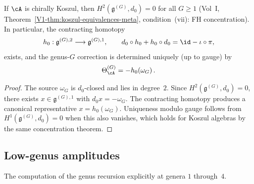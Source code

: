 \begin{corollary}
\label{cor:contracting-homotopy-koszul}
If $\cA$ is chirally Koszul, then $H^2(\mathfrak{g}^{(G)}, d_0) = 0$ for all
$G \geq 1$ (Vol~I, Theorem~\ref*{V1-thm:koszul-equivalences-meta}, condition~(vii):
FH concentration). In particular, the contracting homotopy
\begin{equation}
h_0 : \mathfrak{g}^{(G),2} \longrightarrow \mathfrak{g}^{(G),1},
\qquad
d_0 \circ h_0 + h_0 \circ d_0 = \id - \iota \circ \pi,
\end{equation}
exists, and the genus-$G$ correction is determined uniquely (up to gauge) by
\begin{equation}
\Theta_\cA^{(G)} = -h_0\!\left(\omega_G\right).
\end{equation}
\end{corollary}

\begin{proof}
The source $\omega_G$ is $d_0$-closed and lies in degree~$2$. Since
$H^2(\mathfrak{g}^{(G)}, d_0) = 0$, there exists $x \in \mathfrak{g}^{(G),1}$
with $d_0 x = -\omega_G$. The contracting homotopy produces a canonical
representative $x = h_0(\omega_G)$. Uniqueness modulo gauge follows from
$H^1(\mathfrak{g}^{(G)}, d_0) = 0$ when this also vanishes, which holds for
Koszul algebras by the same concentration theorem.
\end{proof}

\subsection{Low-genus amplitudes}

The computation of the genus recursion explicitly at genera $1$ through~$4$.


